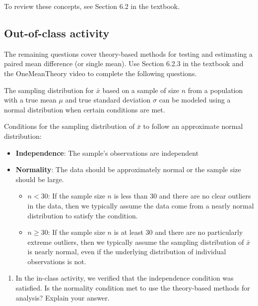 \documentclass[
]{report}
\providecommand{\tightlist}{%
  \setlength{\itemsep}{0pt}\setlength{\parskip}{0pt}}
\begin{document}
To review these concepts, see Section 6.2 in the textbook.

\hypertarget{out-of-class-activity}{%
\subsection{Out-of-class activity}\label{out-of-class-activity}}

The remaining questions cover theory-based methods for testing and estimating a paired mean difference (or single mean). Use Section 6.2.3 in the textbook and the OneMeanTheory video to complete the following questions.

The sampling distribution for \(\bar{x}\) based on a sample of size \(n\) from a population with a true mean \(\mu\) and true standard deviation \(\sigma\) can be modeled using a normal distribution when certain conditions are met.

Conditions for the sampling distribution of \(\bar{x}\) to follow an approximate normal distribution:

\begin{itemize}
\item
  \textbf{Independence}: The sample's observations are independent
\item
  \textbf{Normality}: The data should be approximately normal or the sample size should be large.

  \begin{itemize}
  \item
    \(n < 30\): If the sample size \(n\) is less than 30 and there are no clear outliers in the data, then we typically assume the data come from a nearly normal distribution to satisfy the condition.
  \item
    \(n \geq 30\): If the sample size \(n\) is at least 30 and there are no particularly extreme outliers, then we typically assume the sampling distribution of \(\bar{x}\) is nearly normal, even if the underlying distribution of individual observations is not.
  \end{itemize}
\end{itemize}

\begin{enumerate}
\def\labelenumi{\arabic{enumi}.}
\tightlist
\item
  In the in-class activity, we verified that the independence condition was satisfied. Is the normality condition met to use the theory-based methods for analysis? Explain your answer.
\end{enumerate}
\end{document}
